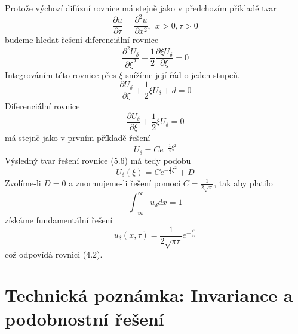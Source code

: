 \documentclass[a4paper]{book}
\begin{document}
Protože výchozí difúzní rovnice má stejně jako v předchozím příkladě tvar
\begin{equation*}
\frac{\partial u}{\partial \tau} = \frac{\partial^2 u}{\partial x^2}, ~~ x > 0, \tau > 0
\end{equation*}
budeme hledat řešení diferenciální rovnice
\begin{equation}
\frac{\partial^2 U_{\delta}}{\partial \xi^2} + \frac{1}{2}\frac{\partial \xi U_{\delta}}{\partial \xi} = 0
\end{equation}
Integrováním této rovnice přes $\xi$ snížíme její řád o jeden stupeň.
\begin{equation*}
\frac{\partial U_{\delta}}{\partial \xi} + \frac{1}{2} \xi U_{\delta} + d = 0
\end{equation*}
Diferenciální rovnice
\begin{equation*}
\frac{\partial U_{\delta}}{\partial \xi} + \frac{1}{2} \xi U_{\delta} = 0
\end{equation*}
má stejně jako v prvním příkladě řešení
\begin{equation*}
U_{\delta} = Ce^{-\frac{1}{4}\xi^2}
\end{equation*}
Výsledný tvar řešení rovnice (5.6) má tedy podobu
\begin{equation*}
U_{\delta}(\xi) = Ce^{-\frac{1}{4}\xi^2} + D
\end{equation*}
Zvolíme-li $D=0$ a znormujeme-li řešení pomocí $C = \frac{1}{2\sqrt{\pi}}$, tak aby platilo
\begin{equation*}
\int^{\infty}_{-\infty}u_{\delta} dx = 1
\end{equation*}
získáme fundamentální řešení
\begin{equation*}
u_{\delta}(x, \tau) = \frac{1}{2\sqrt{\pi \tau}}e^{-\frac{x^2}{4 \tau}}
\end{equation*}
což odpovídá rovnici (4.2).

\section{Technická poznámka: Invariance a podobnostní řešení}
\end{document}
